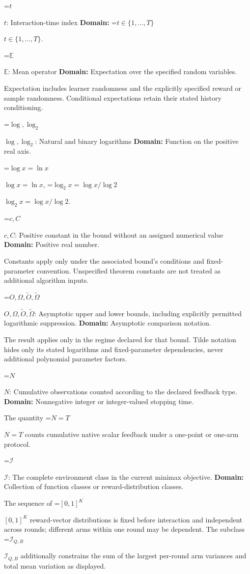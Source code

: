 \documentclass[10pt,a4paper]{article}
\newcommand{\AtlasMath}[1]{\par\begingroup\centering\setbox0=\hbox{$\displaystyle #1$}\ifdim\wd0>1.4\linewidth\typeout{ATLAS WIDE FORMULA: \the\wd0}\fi\ifdim\wd0>\linewidth\resizebox{\linewidth}{!}{\box0}\else\box0\fi\par\endgroup}
\newcommand{\AtlasInlineMath}[1]{\begingroup\setbox0=\hbox{$#1$}\ifdim\wd0>.4\linewidth\endgroup\AtlasMath{#1}\else\endgroup$#1$\fi}
\begin{document}
\AtlasInlineMath{t}: Interaction-time index \textbf{Domain:} \AtlasInlineMath{t\in\{1,\ldots,T\}}.

\AtlasInlineMath{\mathbb E}: Mean operator \textbf{Domain:} Expectation over the specified random variables.

Expectation includes learner randomness and the explicitly specified reward or sample randomness. Conditional expectations retain their stated history conditioning.

\AtlasInlineMath{\log,\log_2}: Natural and binary logarithms \textbf{Domain:} Function on the positive real axis.

\AtlasInlineMath{\log x=\ln x}, \AtlasInlineMath{\log_2x=\log x/\log2}.

\AtlasInlineMath{c,C}: Positive constant in the bound without an assigned numerical value \textbf{Domain:} Positive real number.

Constants apply only under the associated bound’s conditions and fixed-parameter convention. Unspecified theorem constants are not treated as additional algorithm inputs.

\AtlasInlineMath{O,\Omega,\widetilde O,\widetilde\Omega}: Asymptotic upper and lower bounds, including explicitly permitted logarithmic suppression. \textbf{Domain:} Asymptotic comparison notation.

The result applies only in the regime declared for that bound. Tilde notation hides only its stated logarithms and fixed-parameter dependencies, never additional polynomial parameter factors.

\AtlasInlineMath{N}: Cumulative observations counted according to the declared feedback type. \textbf{Domain:} Nonnegative integer or integer-valued stopping time.

The quantity \AtlasInlineMath{N=T} counts cumulative native scalar feedback under a one-point or one-arm protocol.

\AtlasInlineMath{\mathcal I}: The complete environment class in the current minimax objective. \textbf{Domain:} Collection of function classes or reward-distribution classes.

The sequence of \AtlasInlineMath{[0,1]^K} reward-vector distributions is fixed before interaction and independent across rounds; different arms within one round may be dependent. The subclass \AtlasInlineMath{\mathcal I_{Q,B}} additionally constrains the sum of the largest per-round arm variances and total mean variation as displayed.
\end{document}

